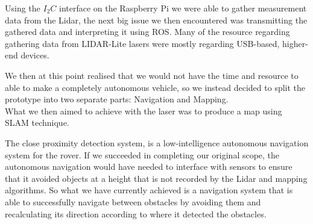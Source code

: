 Using the $I_2C$ interface on the Raspberry Pi we were able to gather measurement data from the Lidar, the next big issue we then encountered was transmitting the gathered data and interpreting it using ROS. Many of the resource regarding gathering data from LIDAR-Lite lasers were mostly regarding USB-based, higher-end devices. %


We then at this point realised that we would not have the time and resource to able to make a completely autonomous vehicle, so we instead decided to split the prototype into two separate parts: Navigation and Mapping.\\
What we then aimed to achieve with the laser was to produce a map using SLAM technique. %

The close proximity detection system, is a low-intelligence autonomous navigation system for the rover. If we succeeded in completing our original scope, the autonomous navigation would have needed to interface with sensors to ensure that it avoided objects at a height that is not recorded by the Lidar and mapping algorithms. So what we have currently achieved is a navigation system that is able to successfully navigate between obstacles by avoiding them and recalculating its direction according to where it detected the obstacles.\\

